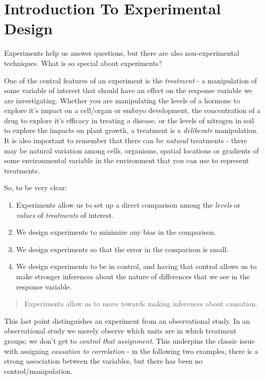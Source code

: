 \documentclass[
]{book}
\providecommand{\tightlist}{%
  \setlength{\itemsep}{0pt}\setlength{\parskip}{0pt}}
\begin{document}
\hypertarget{introduction-to-experimental-design}{%
\chapter{Introduction To Experimental Design}\label{introduction-to-experimental-design}}

Experiments help us answer questions, but there are also non-experimental techniques. What is so special about experiments?

One of the central features of an experiment is the \emph{treatment} - a manipulation of some variable of interest that should have an effect on the response variable we are investigating. Whether you are manipulating the levels of a hormone to explore it's impact on a cell/organ or embryo development, the concentration of a drug to explore it's efficacy in treating a disease, or the levels of nitrogen in soil to explore the impacts on plant growth, a treatment is a \emph{deliberate} manipulation.\\
It is also important to remember that there can be \emph{natural} treatments - there may be natural variation among cells, organisms, spatial locations or gradients of some environmental variable in the environment that you can use to represent treatments.

So, to be very clear:

\begin{enumerate}
\def\labelenumi{\arabic{enumi}.}
\tightlist
\item
  Experiments allow us to set up a direct comparison among the \emph{levels} or \emph{values} of \emph{treatments} of interest.
\item
  We design experiments to minimize any bias in the comparison.
\item
  We design experiments so that the error in the comparison is small.
\item
  We design experiments to be in control, and having that control allows us to make stronger inferences about the nature of differences that we see in the response variable.
\end{enumerate}

\begin{quote}
Experiments allow us to move towards making inferences about causation.
\end{quote}

This last point distinguishes an experiment from an observational study. In an observational study we merely observe which units are in which treatment groups; we don't get to \emph{control that assignment}. This underpins the classic issue with assigning \emph{causation to correlation} - in the following two examples, there is a strong association between the variables, but there has been no control/manipulation.
\end{document}
